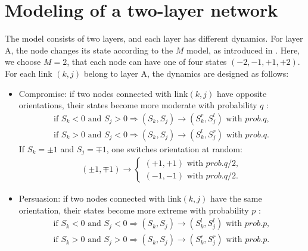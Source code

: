 \section{Modeling of a two-layer network}
\label{sec:modeling of two layer network}
The model consists of two layers, and each layer has different dynamics. For layer A, the node changes its state according to the $M$ model, as introduced in \parencite{rocca2014}. Here, we choose $M=2$, that each node can have one of four states $(-2, -1, +1, +2)$. For each link $(k, j)$ belong to layer A, the dynamics are designed as follows:
\begin{itemize}
	\item Compromise: if two nodes connected with link$(k, j)$ have opposite orientations, their states become more moderate with probability $q$ :
	\begin{align}
	\mbox{if } S_k<0 \mbox{ and } S_j>0  \Rightarrow (S_k, S_j) \rightarrow (S_k^r, S_j^l) \mbox{ with } prob.q,\\
	\mbox{if } S_k>0 \mbox{ and } S_j<0  \Rightarrow (S_k, S_j) \rightarrow (S_k^l, S_j^r) \mbox{ with } prob.q.
	\end{align}
	If $S_k = \pm1$ and $S_j = \mp1$, one switches orientation at random:
	\begin{align}
	(\pm 1, \mp 1)\rightarrow \left\{\begin{matrix}
	(+1, +1) \mbox{ with } prob.q/2,
	\\(-1, -1)\mbox{ with } prob.q/2.
	\end{matrix}\right.
	\end{align}
		
	\item Persuasion: if two nodes connected with link$(k, j)$ have the same orientation, their states become more extreme with probability $p$ :
	\begin{align}
	\mbox{if } S_k<0 \mbox{ and } S_j<0  \Rightarrow (S_k, S_j) \rightarrow (S_k^l, S_j^l) \mbox{ with } prob.p,\\
	\mbox{if } S_k>0 \mbox{ and } S_j>0  \Rightarrow (S_k, S_j) \rightarrow (S_k^r, S_j^r) \mbox{ with } prob.p.
	\end{align}
\end{itemize}

